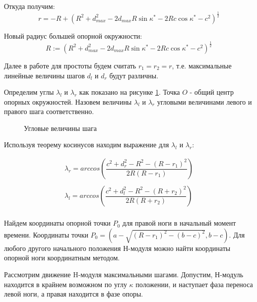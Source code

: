 Откуда получим:
\begin{equation}
r = -R+(R^2+d^2_{max}-2d_{max}R\sin{\kappa^*}-2Rc\cos{\kappa^*}-c^2)^\frac{1}{2}
\end{equation}

Новый радиус большей опорной окружности:
\begin{equation}
R:=(R^2+d^2_{max}-2d_{max}R\sin{\kappa^*}-2Rc\cos{\kappa^*}-c^2)^\frac{1}{2}
\end{equation}

Далее в работе для простоты будем считать $r_1 = r_2 = r$, т.е. максимальные линейные величины шагов $d_l$ и $d_r$ будут различны.


Определим углы $\lambda_l$ и $\lambda_r$ как показано на рисунке \ref{angular_step}. Точка $O$ - общий центр опорных окружностей. Назовем величины $\lambda_l$ и $\lambda_r$ угловыми величинами левого и правого шага соответственно.

\begin{figure}
\caption{Угловые величины шага}
\label{angular_step}
\end{figure}

Используя теорему косинусов находим выражение для $\lambda_l$ и $\lambda_r$:

\begin{equation}
\begin{array}{lcr}
\lambda_r = arccos\left(\dfrac{c^2+d^2_r-R^2-(R-r_1)^2}{2R(R-r_1)}\right)\\
\\
\lambda_l = arccos\left(\dfrac{c^2+d^2_l-R^2-(R+r_2)^2}{2R(R+r_2)}\right)\\
\end{array}
\label{lambdas}
\end{equation}

Найдем координаты опорной точки $P_0$ для правой ноги в начальный момент времени. Координаты точки $P_0 = (a-\sqrt{(R-r_1)^2-(b-c)^2},b-c)$. Для любого другого начального положения Н-модуля можно найти координаты опорной ноги координатным методом.

Рассмотрим движение H-модуля максимальными шагами. Допустим, Н-модуль находится в крайнем возможном по углу $\kappa$ положении, и наступает фаза переноса левой ноги, а правая находится в фазе опоры.

